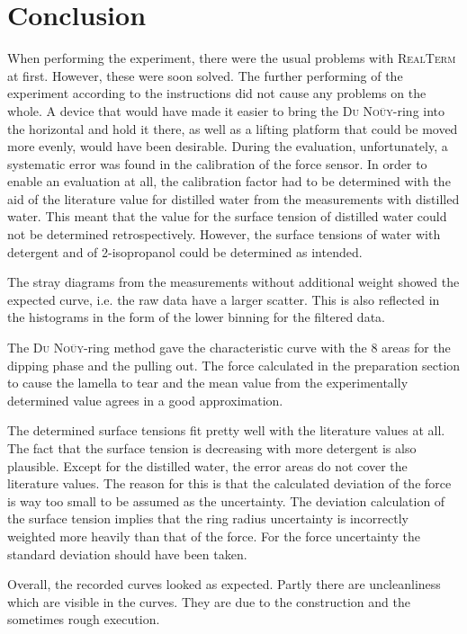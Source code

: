 \chapter{Conclusion}
When performing the experiment, there were the usual problems with \textsc{RealTerm} at first. However, these were soon
solved. The further performing of the experiment according to the instructions did not cause any problems on the whole.
A device that would have made it easier to bring the \textsc{Du Noüy}-ring into the horizontal and hold it there, as well
as a lifting platform that could be moved more evenly, would have been desirable. During the evaluation, unfortunately,
a systematic error was found in the calibration of the force sensor. In order to enable an evaluation at all, the calibration
factor had to be determined with the aid of the literature value for distilled water from the measurements with distilled water.
This meant that the value for the surface tension of distilled water could not be determined retrospectively. However, the
surface tensions of water with detergent and of 2-isopropanol could be determined as intended.\par
The stray diagrams from the measurements without additional weight showed the expected curve, i.e. the raw data have a
larger scatter. This is also reflected in the histograms in the form of the lower binning for the filtered data.\par
The \textsc{Du Noüy}-ring method gave the characteristic curve with the 8 areas for the dipping phase and the pulling out.
The force calculated in the preparation section to cause the lamella to tear and the mean value from the experimentally
determined value agrees in a good approximation.\par
The determined surface tensions fit pretty well with the literature values at all. The fact that the surface tension is
decreasing with more detergent is also plausible. Except for the distilled water, the error areas do not cover the literature
values. The reason for this is that the calculated deviation of the force is way too small to be assumed as the uncertainty.
The deviation calculation of the surface tension implies that the ring radius uncertainty is incorrectly weighted more
heavily than that of the force. For the force uncertainty the standard deviation should have been taken.\par
Overall, the recorded curves looked as expected. Partly there are uncleanliness which are visible in the curves. They are
due to the construction and the sometimes rough execution.
